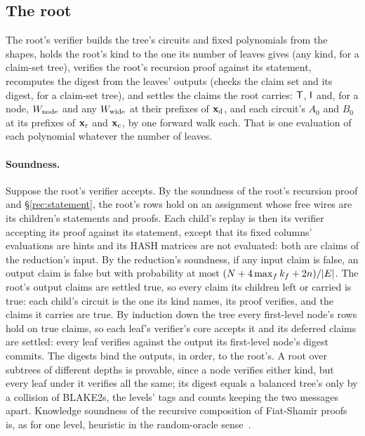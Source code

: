 \subsection{The root}\label{rec:root}

The root's verifier builds the tree's circuits and fixed polynomials from the shapes, holds the root's kind to the one its number of leaves gives (any kind, for a claim-set tree), verifies the root's recursion proof against its statement, recomputes the digest from the leaves' outputs (checks the claim set and its digest, for a claim-set tree), and settles the claims the root carries: $\mathsf{T}$, $\mathsf{I}$ and, for a node, $W_{\mathrm{node}}$ and any $W_{\mathrm{wide}}$ at their prefixes of $\mathbf{x}_{\mathrm{d}}$, and each circuit's $A_0$ and $B_0$ at its prefixes of $\mathbf{x}_{\mathrm{r}}$ and $\mathbf{x}_{\mathrm{c}}$, by one forward walk each. That is one evaluation of each polynomial whatever the number of leaves.

\paragraph{Soundness.} Suppose the root's verifier accepts. By the soundness of the root's recursion proof and \S\ref{rec:statement}, the root's rows hold on an assignment whose free wires are its children's statements and proofs. Each child's replay is then its verifier accepting its proof against its statement, except that its fixed columns' evaluations are hints and its \textsf{HASH} matrices are not evaluated: both are claims of the reduction's input. By the reduction's soundness, if any input claim is false, an output claim is false but with probability at most $(N+4\max_fk_f+2n)/|E|$. The root's output claims are settled true, so every claim its children left or carried is true: each child's circuit is the one its kind names, its proof verifies, and the claims it carries are true. By induction down the tree every first-level node's rows hold on true claims, so each leaf's verifier's core accepts it and its deferred claims are settled: every leaf verifies against the output its first-level node's digest commits. The digests bind the outputs, in order, to the root's. A root over subtrees of different depths is provable, since a node verifies either kind, but every leaf under it verifies all the same; its digest equals a balanced tree's only by a collision of BLAKE2s, the levels' tags and counts keeping the two messages apart. Knowledge soundness of the recursive composition of Fiat-Shamir proofs is, as for one level, heuristic in the random-oracle sense~\cite{BCCT13}.

